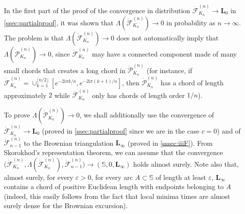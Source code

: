 \documentclass[AHL,XML,longabstracts,Unicode]{cedram}
\def\S{\mathbb{S}}
\def\i{\mathrm{i}}
\def\dFKn{\dot{\mathcal{F}}^{(n)}_{K_{n}}}
\def\dPKn{\dot{\mathcal{P}}^{(n)}_{K_{n}}}
\renewcommand{\epsilon}{\varepsilon}
\begin{document}
In the first part of the proof of the convergence in distribution $\dFKn \rightarrow \mathbf{L}_0$ in \cref{ssec:partialproof}, it was shown that  $\Lambda(\dFKn) \rightarrow 0$ in probability as $n \rightarrow \infty$.
The problem is that $\Lambda(\dFKn) \rightarrow 0$ does not automatically imply that $\Lambda(\dPKn) \rightarrow 0$,
since $\dFKn$ may have a connected component made of many small chords
that creates a long chord in $\dPKn$ (for instance, if $\dFKn= \cup_{k=1}^{\lfloor n/2 \rfloor} [e^{-2 \i \pi k/n},e^{-2 \i \pi (k+1)/n}]$, then $\dPKn$ has a chord of length approximately $2$ while $\dFKn$ only has chords of length order $1/n$).

To prove $\Lambda(\dPKn) \rightarrow 0$, we shall additionally use the convergence
of $\dFKn \rightarrow \mathbf{L}_0$ (proved in \cref{ssec:partialproof} since we are in the case $c=0$)
and of $\dot{\mathcal{F}}^{(n)}_{n-1}$ to the Brownian triangulation $\mathbf{L}_{\infty}$ (proved in \cref{sssec:iiiF}).
From Skorokhod's representation theorem, we can assume that the convergence
$\big(\dFKn, \Lambda(\dFKn), \dot{\mathcal{F}}^{(n)}_{n-1}\big) \rightarrow (\S,0,\mathbf{L}_{\infty})$ holds almost surely.
Note also that, almost surely, for every $\epsilon>0$, for every arc ${A} \subset \S$ of length at least $\epsilon$,
$\mathbf{L}_{\infty}$ contains a chord of positive Euclidean length with endpoints belonging to $ {A}$ (indeed, this easily follows from the fact that local minima times are almost surely dense for the Brownian excursion).
\end{document}
